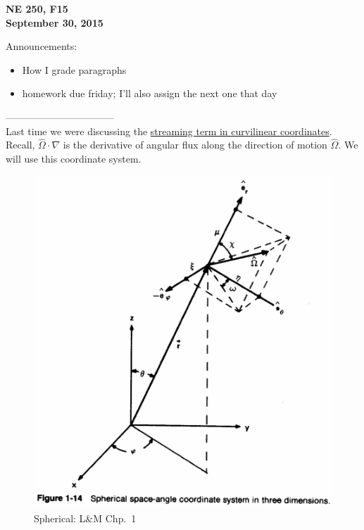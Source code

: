 \documentclass[12pt]{article}
\newcommand{\vOmega}{\ensuremath{\hat{\Omega}}}
\begin{document}
\begin{center}
{\bf NE 250, F15\\
September 30, 2015 
}
\end{center}

Announcements:
\begin{itemize}
\item How I grade paragraphs
\item homework due friday; I'll also assign the next one that day
\end{itemize}

---------------------------------\\
Last time we were discussing the \underline{streaming term in curvilinear coordinates}.
Recall, $\vOmega \cdot \nabla$ is the derivative of angular flux along the direction of motion $\vOmega$. We will use this coordinate system.
%
\begin{figure}[h!]
    \begin{center}
    \includegraphics[keepaspectratio, width = 3.5 in]{../figs/spherical-coords}
    \end{center}    
    \label{fig:sph-coord} 
    \caption{Spherical: L\&M Chp.\ 1}
\end{figure}
\end{document}
